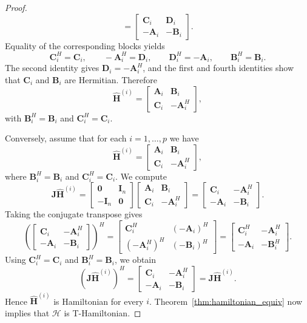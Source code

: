 \documentclass[10pt,a4paper]{amsart}
\newcommand{\M}[1]{\bm{#1}}     %
\newcommand{\T}[1]{\mathcal{#1}}    %
\begin{document}
\begin{proof}
$$=
\begin{bmatrix}
\M{C}_i & \M{D}_i \\
-\M{A}_i & -\M{B}_i
\end{bmatrix}.
$$
Equality of the corresponding blocks yields
$$
\M{C}_i^H = \M{C}_i, \qquad
-\M{A}_i^H = \M{D}_i, \qquad
\M{D}_i^H = -\M{A}_i, \qquad
\M{B}_i^H = \M{B}_i.
$$
The second identity gives $\M{D}_i = -\M{A}_i^H$, and the first and fourth identities show that $\M{C}_i$ and $\M{B}_i$ are Hermitian. Therefore
$$
\widehat{\M{H}}^{(i)} =
\begin{bmatrix}
\M{A}_i & \M{B}_i \\
\M{C}_i & -\M{A}_i^H
\end{bmatrix},
$$
with $\M{B}_i^H = \M{B}_i$ and $\M{C}_i^H = \M{C}_i$.

Conversely, assume that for each $i=1,\dots,p$ we have
$$
\widehat{\M{H}}^{(i)} =
\begin{bmatrix}
\M{A}_i & \M{B}_i \\
\M{C}_i & -\M{A}_i^H
\end{bmatrix},
$$
where $\M{B}_i^H = \M{B}_i$ and $\M{C}_i^H = \M{C}_i$. We compute
$$
\M{J}\widehat{\M{H}}^{(i)}
=
\begin{bmatrix}
\M{0} & \M{I}_n \\
-\M{I}_n & \M{0}
\end{bmatrix}
\begin{bmatrix}
\M{A}_i & \M{B}_i \\
\M{C}_i & -\M{A}_i^H
\end{bmatrix}
=
\begin{bmatrix}
\M{C}_i & -\M{A}_i^H \\
-\M{A}_i & -\M{B}_i
\end{bmatrix}.
$$
Taking the conjugate transpose gives
$$
\left(
\begin{bmatrix}
\M{C}_i & -\M{A}_i^H \\
-\M{A}_i & -\M{B}_i
\end{bmatrix}
\right)^H
=
\begin{bmatrix}
\M{C}_i^H & (-\M{A}_i)^H \\
(-\M{A}_i^H)^H & (-\M{B}_i)^H
\end{bmatrix}
=
\begin{bmatrix}
\M{C}_i^H & -\M{A}_i^H \\
-\M{A}_i & -\M{B}_i^H
\end{bmatrix}.
$$
Using $\M{C}_i^H = \M{C}_i$ and $\M{B}_i^H = \M{B}_i$, we obtain
$$
(\M{J}\widehat{\M{H}}^{(i)})^H
=
\begin{bmatrix}
\M{C}_i & -\M{A}_i^H \\
-\M{A}_i & -\M{B}_i
\end{bmatrix}
=
\M{J}\widehat{\M{H}}^{(i)}.
$$
Hence $\widehat{\M{H}}^{(i)}$ is Hamiltonian for every $i$. Theorem~\ref{thm:hamiltonian_equiv} now implies that $\T{H}$ is T-Hamiltonian.
\end{proof}
\end{document}
